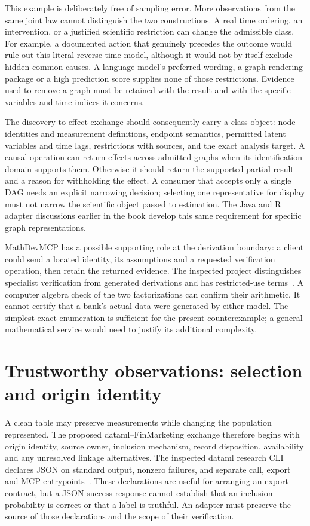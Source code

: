 This example is deliberately free of sampling error. More observations from
the same joint law cannot distinguish the two constructions. A real time
ordering, an intervention, or a justified scientific restriction can change
the admissible class. For example, a documented action that genuinely precedes
the outcome would rule out this literal reverse-time model, although it
would not by itself exclude hidden common causes. A language model's preferred
wording, a graph rendering package or a high prediction score supplies none
of those restrictions. Evidence used to remove a graph must be retained with
the result and with the specific variables and time indices it concerns.

The discovery-to-effect exchange should consequently carry a class object:
node identities and measurement definitions, endpoint semantics, permitted
latent variables and time lags, restrictions with sources, and the exact
analysis target. A causal operation can return effects across admitted graphs
when its identification domain supports them. Otherwise it should return the
supported partial result and a reason for withholding the effect. A consumer
that accepts only a single DAG needs an explicit narrowing decision; selecting
one representative for display must not narrow the scientific object passed
to estimation. The Java and R adapter discussions earlier in the book develop
this same requirement for specific graph representations.

MathDevMCP has a possible supporting role at the derivation boundary: a
client could send a located identity, its assumptions and a requested
verification operation, then retain the returned evidence. The inspected
project distinguishes specialist verification from generated derivations and
has restricted-use terms~\citep{v12_in_inventory}. A computer algebra check of
the two factorizations can confirm their arithmetic. It cannot certify that
a bank's actual data were generated by either model. The simplest exact
enumeration is sufficient for the present counterexample; a general
mathematical service would need to justify its additional complexity.

\section{Trustworthy observations: selection and origin identity}

A clean table may preserve measurements while changing the population
represented. The proposed dataml--FinMarketing exchange therefore begins
with origin identity, source owner, inclusion mechanism, record disposition,
availability and any unresolved linkage alternatives. The inspected dataml
research CLI declares JSON on standard output, nonzero failures, and separate
call, export and MCP entrypoints~\citep{exec13_i3_inspection}. These declarations
are useful for arranging an export contract, but a JSON success response
cannot establish that an inclusion probability is correct or that a label is
truthful. An adapter must preserve the source of those declarations and the
scope of their verification.

